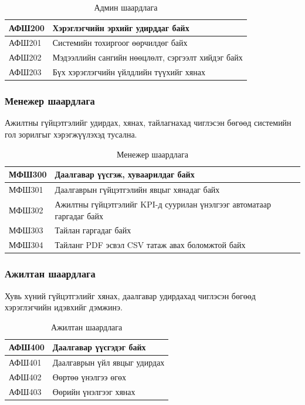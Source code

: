 \begin{table}[H]
    \centering
    \label{my-label-2}
    \begin{tabular}{|p{1.7cm}|p{12cm}|}
        \hline
          АФШ200 & Хэрэглэгчийн эрхийг удирддаг байх\\ \hline
          АФШ201 & Системийн тохиргоог өөрчилдөг байх\\ \hline
          АФШ202 & Мэдээллийн сангийн нөөцлөлт, сэргээлт хийдэг байх\\\hline
          АФШ203 & Бүх хэрэглэгчийн үйлдлийн түүхийг хянах\\ \hline
    \end{tabular}
    \caption{Админ шаардлага}
\end{table}

\subsubsection{Менежер шаардлага}
Ажилтны гүйцэтгэлийг удирдах, хянах, тайлагнахад чиглэсэн бөгөөд системийн гол зорилгыг хэрэгжүүлэхэд тусална.

\begin{table}[H]
    \centering
    \label{my-label-3}
    \begin{tabular}{|p{1.7cm}|p{12cm}|}
        \hline
          МФШ300 & Даалгавар үүсгэж, хуваарилдаг байх\\ \hline
          МФШ301 & Даалгаврын гүйцэтгэлийн явцыг хянадаг байх\\ \hline
          МФШ302 & Ажилтны гүйцэтгэлийг KPI-д суурилан үнэлгээг автоматаар гаргадаг байх\\\hline
          МФШ303 & Тайлан гаргадаг байх\\ \hline
          МФШ304 & Тайланг PDF эсвэл CSV татаж авах боломжтой байх\\ \hline
    \end{tabular}
    \caption{Менежер шаардлага}
\end{table}

\subsubsection{Ажилтан шаардлага}
Хувь хүний гүйцэтгэлийг хянах, даалгавар удирдахад чиглэсэн бөгөөд хэрэглэгчийн идэвхийг дэмжинэ.

\begin{table}[H]
    \centering
    \label{my-label-4}
    \begin{tabular}{|p{1.7cm}|p{12cm}|}
        \hline
        АФШ400 & Даалгавар үүсгэдэг байх\\ \hline
        АФШ401 & Даалгаврын үйл явцыг удирдах\\ \hline
        АФШ402 & Өөртөө үнэлгээ өгөх\\\hline
        АФШ403 & Өөрийн үнэлгээг хянах\\ \hline
    \end{tabular}
    \caption{Ажилтан шаардлага}
\end{table}

